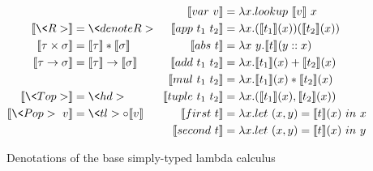   \begin{figure}
    \centering
    \begin{equation*}
      \begin{split}
        \llbracket \<R> \rrbracket &= \<denoteR> \\
        \llbracket \tau \times \sigma \rrbracket &=
          \llbracket \tau \rrbracket * \llbracket \sigma \rrbracket \\
        \llbracket \tau \rightarrow \sigma \rrbracket &= \llbracket \tau \rrbracket \rightarrow \llbracket \sigma \rrbracket \\
        \\
        \llbracket \<Top> \rrbracket &= \<hd> \\
        \llbracket \<Pop>\ v \rrbracket &= \<tl> \circ \llbracket v \rrbracket \\
      \end{split}
      \;\;\;
      \begin{split}
        \llbracket \var{v} \rrbracket &=
          \lambda x. lookup\ \llbracket v \rrbracket\ x \\
        \llbracket \app{t_1}{t_2} \rrbracket &=
          \lambda x. (\llbracket t_1 \rrbracket(x)) (\llbracket t_2 \rrbracket(x)) \\
        \llbracket \abs{t} \rrbracket &=
          \lambda x\ y. \llbracket t \rrbracket(y :: x) \\
        \llbracket \add{t_1}{t_2} \rrbracket &=
          \lambda x. \llbracket t_1 \rrbracket(x) + \llbracket t_2 \rrbracket(x) \\
        \llbracket \mul{t_1}{t_2} \rrbracket &=
          \lambda x. \llbracket t_1 \rrbracket(x) * \llbracket t_2 \rrbracket(x) \\
        \llbracket \tuple{t_1}{t_2} \rrbracket &=
          \lambda x. (\llbracket t_1 \rrbracket(x), \llbracket t_2 \rrbracket(x)) \\
        \llbracket \first{t} \rrbracket &=
          \lambda x. let\ (x, y) = \llbracket t \rrbracket(x)\ in\ x \\
        \llbracket \second{t} \rrbracket &=
          \lambda x. let\ (x, y) = \llbracket t \rrbracket(x)\ in\ y \\
      \end{split}
    \end{equation*}
    \caption{Denotations of the base simply-typed lambda calculus}
    \label{eqn:denotation_base}
  \end{figure}

